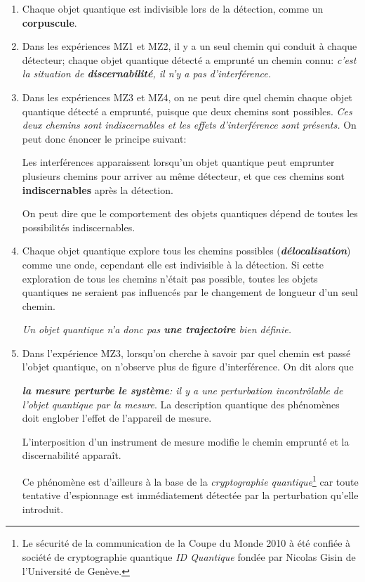 \begin{enumerate}
\item Chaque objet quantique est indivisible lors de la détection, comme un
\textbf{corpuscule}.

\item Dans les expériences MZ1 et MZ2, il y a un seul chemin qui conduit à
chaque
détecteur; chaque objet quantique détecté a emprunté un chemin connu:
\emph{c'est la situation de \textbf{discernabilité}, il n'y a pas
d'interférence.}

\item Dans les expériences MZ3 et MZ4, on ne peut dire quel chemin chaque objet
quantique détecté a emprunté, puisque que deux chemins sont possibles.
\emph{Ces deux chemins sont indiscernables et les effets d'interférence sont
présents.} On peut donc énoncer le principe suivant:

\colorbox[gray]{0.8}{
\parbox[c]{0.9\textwidth}{
\begin{principe} Les interférences apparaissent
lorsqu'un objet quantique peut emprunter plusieurs chemins pour arriver au même
détecteur, et que ces chemins sont \textbf{indiscernables} après la détection.
\end{principe}
}}

On peut dire que le comportement des objets quantiques dépend de toutes les
possibilités indiscernables.

\item Chaque objet quantique explore tous les chemins possibles
(\emph{\textbf{délocalisation}}) comme une onde, cependant elle est
indivisible à la détection. Si cette exploration de tous les chemins n'était
pas possible, toutes les objets quantiques ne seraient pas influencés par le
changement de longueur d'un seul chemin.

\medskip\colorbox[gray]{0.8}{
\parbox[c]{0.9\textwidth}{
\emph{Un objet quantique n'a donc pas \textbf{une trajectoire} bien définie.}
}}

\item Dans l'expérience MZ3, lorsqu'on cherche à savoir par quel chemin est
passé l'objet quantique, on n'observe plus de figure d'interférence. On dit
alors que

\medskip\colorbox[gray]{0.8}{
\parbox[c]{0.9\textwidth}{
\emph{ \textbf{la mesure perturbe le système}: il y a une perturbation
incontrôlable de l'objet quantique par la mesure}. La description quantique des
phénomènes doit englober l'effet de l'appareil de mesure.
}}\medskip

L'interposition d'un instrument de mesure modifie le chemin emprunté et la
discernabilité apparaît.

Ce phénomène est d'ailleurs à la base de la \emph{cryptographie
quantique}\footnote{Le sécurité de la communication de la Coupe du Monde 2010 à
été confiée à société de cryptographie quantique \emph{ID Quantique} fondée par
Nicolas Gisin de l'Université de Genève.} car toute tentative d'espionnage est
immédiatement détectée par la perturbation qu'elle introduit.
\end{enumerate}

